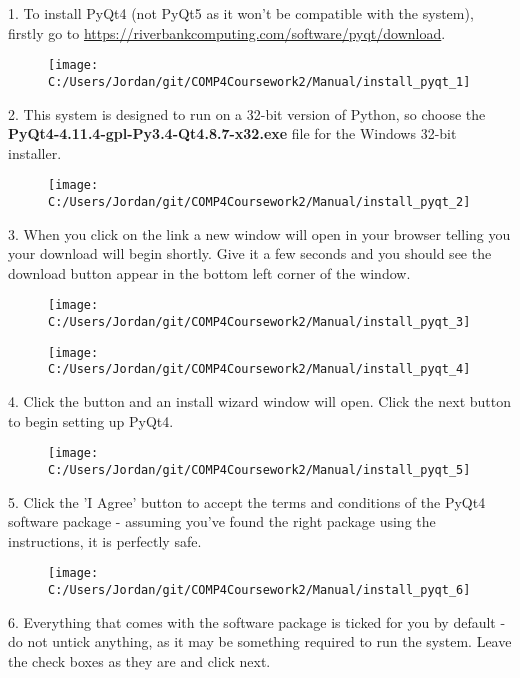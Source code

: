 1. To install PyQt4 (not PyQt5 as it won't be compatible with the system), firstly go to \url{https://riverbankcomputing.com/software/pyqt/download}.

\begin{figure}[H]
    \texttt{[image: C:/Users/Jordan/git/COMP4Coursework2/Manual/install\_pyqt\_1]}
\end{figure}

2. This system is designed to run on a 32-bit version of Python, so choose the \textbf{PyQt4-4.11.4-gpl-Py3.4-Qt4.8.7-x32.exe} file for the Windows 32-bit installer.

\begin{figure}[H]
    \texttt{[image: C:/Users/Jordan/git/COMP4Coursework2/Manual/install\_pyqt\_2]}
\end{figure}

3. When you click on the link a new window will open in your browser telling you your download will begin shortly. Give it a few seconds and you should see the download button appear in the bottom left corner of the window.

\begin{figure}[H]
    \texttt{[image: C:/Users/Jordan/git/COMP4Coursework2/Manual/install\_pyqt\_3]}
\end{figure}

\begin{figure}[H]
    \texttt{[image: C:/Users/Jordan/git/COMP4Coursework2/Manual/install\_pyqt\_4]}
\end{figure}

4. Click the button and an install wizard window will open. Click the next button to begin setting up PyQt4.

\begin{figure}[H]
    \texttt{[image: C:/Users/Jordan/git/COMP4Coursework2/Manual/install\_pyqt\_5]}
\end{figure}

5. Click the 'I Agree' button to accept the terms and conditions of the PyQt4 software package - assuming you've found the right package using the instructions, it is perfectly safe.

\begin{figure}[H]
    \texttt{[image: C:/Users/Jordan/git/COMP4Coursework2/Manual/install\_pyqt\_6]}
\end{figure}

6. Everything that comes with the software package is ticked for you by default - do not untick anything, as it may be something required to run the system. Leave the check boxes as they are and click next.

